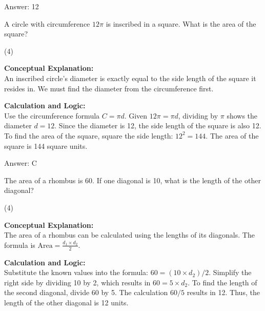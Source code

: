 \documentclass[11pt,paper=a4,answers]{exam}
\begin{document}
\begin{questions}
\begin{solution}
Answer: \colorbox{yellow!100}{12}
\end{solution}

\vspace{60pt}

\question
A circle with circumference $12\pi$ is inscribed in a square. What is the area of the square?
\begin{tasks}(4)
\end{tasks}

\begin{solution}
\textbf{Conceptual Explanation:} \\
An inscribed circle's diameter is exactly equal to the side length of the square it resides in. We must find the diameter from the circumference first.

\vspace{30pt}

\textbf{Calculation and Logic:} \\
Use the circumference formula $C = \pi d$. Given $12\pi = \pi d$, dividing by $\pi$ shows the diameter $d = 12$. Since the diameter is 12, the side length of the square is also 12. To find the area of the square, square the side length: $12^2 = 144$. The area of the square is 144 square units.

\vspace{30pt}

Answer: \colorbox{yellow!100}{C}
\end{solution}

\vspace{60pt}

\question
The area of a rhombus is 60. If one diagonal is 10, what is the length of the other diagonal?
\begin{tasks}(4)
\end{tasks}

\begin{solution}
\textbf{Conceptual Explanation:} \\
The area of a rhombus can be calculated using the lengths of its diagonals. The formula is $\text{Area} = \frac{d_1 \times d_2}{2}$.

\vspace{30pt}

\textbf{Calculation and Logic:} \\
Substitute the known values into the formula: $60 = (10 \times d_2) / 2$. Simplify the right side by dividing 10 by 2, which results in $60 = 5 \times d_2$. To find the length of the second diagonal, divide 60 by 5. The calculation $60 / 5$ results in 12. Thus, the length of the other diagonal is 12 units.


\end{solution}
\end{questions}
\end{document}
